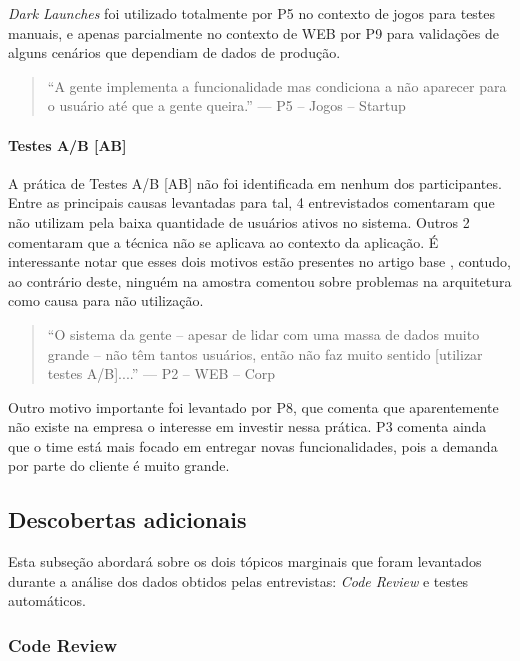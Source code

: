 \emph{Dark Launches} foi utilizado totalmente por P5 no contexto de jogos para testes manuais, e apenas parcialmente no contexto de WEB por P9 para validações de alguns cenários que dependiam de dados de produção.


\begin{quote}
    ``A gente implementa a funcionalidade mas condiciona a não aparecer para o usuário até que a gente queira.'' --- P5 -- Jogos -- Startup
\end{quote}

\paragraph{Testes A/B [AB]}

A prática de Testes A/B [AB] \cite{testsAB} não foi identificada em nenhum dos participantes. Entre as principais causas levantadas para tal, 4 entrevistados comentaram que não utilizam pela baixa quantidade de usuários ativos no sistema. Outros 2 comentaram que a técnica não se aplicava ao contexto da aplicação. É interessante notar que esses dois motivos estão presentes no artigo base \cite{empiricalStudy2016}, contudo, ao contrário deste, ninguém na amostra comentou sobre problemas na arquitetura como causa para não utilização.


\begin{quote}
    ``O sistema da gente -- apesar de lidar com uma massa de dados muito grande -- não têm tantos usuários, então não faz muito sentido [utilizar testes A/B]....'' --- P2 -- WEB -- Corp
\end{quote}

Outro motivo importante foi levantado por P8, que comenta que aparentemente não existe na empresa o interesse em investir nessa prática. P3 comenta ainda que o time está mais focado em entregar novas funcionalidades, pois a demanda por parte do cliente é muito grande.

\subsection{Descobertas adicionais}

Esta subseção abordará sobre os dois tópicos marginais que foram levantados durante a análise dos dados obtidos pelas entrevistas: \emph{Code Review} e testes automáticos.

\subsubsection{Code Review}

